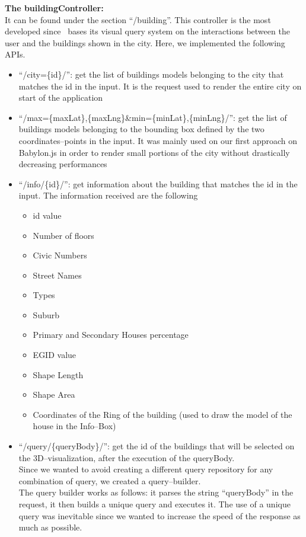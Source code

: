 {\bf The buildingController:}\\
It can be found under the section ``/building''. This controller is the most developed since \applicationName\ bases its visual query system on the interactions between the user and the buildings shown in the city. Here, we implemented the following APIs.
\begin{itemize}
	\item ``/city=\{id\}/'': get the list of buildings models belonging to the city that matches the id in the input. It is the request used to render the entire city on start of the application
	\item ``/max=\{maxLat\},\{maxLng\}\&min=\{minLat\},\{minLng\}/'': get the list of buildings models belonging to the bounding box defined by the two coordinates--points in the input. It was mainly used on our first approach on Babylon.js in order to render small portions of the city without drastically decreasing performances
	\item ``/info/\{id\}/'': get information about the building that matches the id in the input. The information received are the following
		\begin{itemize}
			\item id value
			\item Number of floors
			\item Civic Numbers
			\item Street Names
			\item Types
			\item Suburb
			\item Primary and Secondary Houses percentage
			\item EGID value
			\item Shape Length
			\item Shape Area 
			\item Coordinates of the Ring of the building (used to draw the model of the house in the Info--Box)
		\end{itemize}
	\item ``/query/\{queryBody\}/'': get the id of the buildings that will be selected on the 3D--visualization, after the execution of the queryBody.\\ Since we wanted to avoid creating a different query repository for any combination of query, we created a query--builder.\\ The query builder works as follows: it parses the string ``queryBody'' in the request, it then builds a unique query and executes it. The use of a unique query was inevitable since we wanted to increase the speed of the response as much as possible.

\end{itemize}
